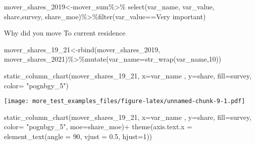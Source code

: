 \documentclass[
]{article}
\newenvironment{Shaded}{\begin{snugshade}}{\end{snugshade}}
\newcommand{\AttributeTok}[1]{\textcolor[rgb]{0.77,0.63,0.00}{#1}}
\newcommand{\DecValTok}[1]{\textcolor[rgb]{0.00,0.00,0.81}{#1}}
\newcommand{\FloatTok}[1]{\textcolor[rgb]{0.00,0.00,0.81}{#1}}
\newcommand{\FunctionTok}[1]{\textcolor[rgb]{0.00,0.00,0.00}{#1}}
\newcommand{\NormalTok}[1]{#1}
\newcommand{\OtherTok}[1]{\textcolor[rgb]{0.56,0.35,0.01}{#1}}
\newcommand{\SpecialCharTok}[1]{\textcolor[rgb]{0.00,0.00,0.00}{#1}}
\newcommand{\StringTok}[1]{\textcolor[rgb]{0.31,0.60,0.02}{#1}}
\begin{document}
\begin{Shaded}
\begin{Highlighting}[]
\NormalTok{mover\_shares\_2019}\OtherTok{\textless{}{-}}\NormalTok{mover\_sum}\SpecialCharTok{\%\textgreater{}\%} \FunctionTok{select}\NormalTok{(var\_name, var\_value, share,survey, share\_moe)}\SpecialCharTok{\%\textgreater{}\%}\FunctionTok{filter}\NormalTok{(var\_value}\SpecialCharTok{==}\StringTok{\textquotesingle{}Very important\textquotesingle{}}\NormalTok{)                                                          }
\end{Highlighting}
\end{Shaded}

Why did you move To current residence

\begin{Shaded}
\begin{Highlighting}[]
\NormalTok{mover\_shares\_19\_21}\OtherTok{\textless{}{-}}\FunctionTok{rbind}\NormalTok{(mover\_shares\_2019, mover\_shares\_2021)}\SpecialCharTok{\%\textgreater{}\%}\FunctionTok{mutate}\NormalTok{(}\AttributeTok{var\_name=}\FunctionTok{str\_wrap}\NormalTok{(var\_name,}\DecValTok{10}\NormalTok{))}

\FunctionTok{static\_column\_chart}\NormalTok{(mover\_shares\_19\_21, }\AttributeTok{x=}\StringTok{\textquotesingle{}var\_name\textquotesingle{}}\NormalTok{ , }\AttributeTok{y=}\StringTok{\textquotesingle{}share\textquotesingle{}}\NormalTok{, }\AttributeTok{fill=}\StringTok{\textquotesingle{}survey\textquotesingle{}}\NormalTok{, }\AttributeTok{color=} \StringTok{"pognbgy\_5"}\NormalTok{)}
\end{Highlighting}
\end{Shaded}

\texttt{[image: more\_test\_examples\_files/figure-latex/unnamed-chunk-9-1.pdf]}

\begin{Shaded}
\begin{Highlighting}[]
\FunctionTok{static\_column\_chart}\NormalTok{(mover\_shares\_19\_21, }\AttributeTok{x=}\StringTok{\textquotesingle{}var\_name\textquotesingle{}}\NormalTok{ , }\AttributeTok{y=}\StringTok{\textquotesingle{}share\textquotesingle{}}\NormalTok{, }\AttributeTok{fill=}\StringTok{\textquotesingle{}survey\textquotesingle{}}\NormalTok{, }\AttributeTok{color=} \StringTok{"pognbgy\_5"}\NormalTok{, }\AttributeTok{moe=}\StringTok{\textquotesingle{}share\_moe\textquotesingle{}}\NormalTok{)}\SpecialCharTok{+} \FunctionTok{theme}\NormalTok{(}\AttributeTok{axis.text.x =} \FunctionTok{element\_text}\NormalTok{(}\AttributeTok{angle =} \DecValTok{90}\NormalTok{, }\AttributeTok{vjust =} \FloatTok{0.5}\NormalTok{, }\AttributeTok{hjust=}\DecValTok{1}\NormalTok{))}
\end{Highlighting}
\end{Shaded}
\end{document}
